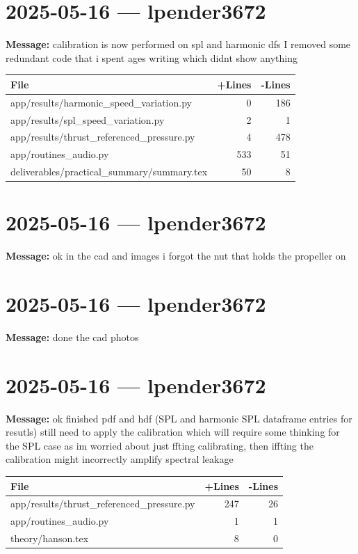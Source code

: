 \documentclass{article}
\begin{document}
\section*{2025-05-16 --- lpender3672}
\textbf{Message:} calibration is now performed on spl and harmonic dfs I removed some redundant code that i spent ages writing which didnt show anything

\begin{longtable}{|p{10cm}|r|r|}
\hline \textbf{File} & \textbf{+Lines} & \textbf{-Lines} \\
\hline
app/results/harmonic\_speed\_variation.py & 0 & 186 \\
\hline
app/results/spl\_speed\_variation.py & 2 & 1 \\
\hline
app/results/thrust\_referenced\_pressure.py & 4 & 478 \\
\hline
app/routines\_audio.py & 533 & 51 \\
\hline
deliverables/practical\_summary/summary.tex & 50 & 8 \\
\hline
\end{longtable}

\section*{2025-05-16 --- lpender3672}
\textbf{Message:} ok in the cad and images i forgot the nut that holds the propeller on

\section*{2025-05-16 --- lpender3672}
\textbf{Message:} done the cad photos

\section*{2025-05-16 --- lpender3672}
\textbf{Message:} ok finished pdf and hdf (SPL and harmonic SPL dataframe entries for resutls) still need to apply the calibration which will require some thinking for the SPL case as im worried about just ffting calibrating, then iffting the calibration might incorrectly amplify spectral leakage

\begin{longtable}{|p{10cm}|r|r|}
\hline \textbf{File} & \textbf{+Lines} & \textbf{-Lines} \\
\hline
app/results/thrust\_referenced\_pressure.py & 247 & 26 \\
\hline
app/routines\_audio.py & 1 & 1 \\
\hline
theory/hanson.tex & 8 & 0 \\
\hline
\end{longtable}
\end{document}
